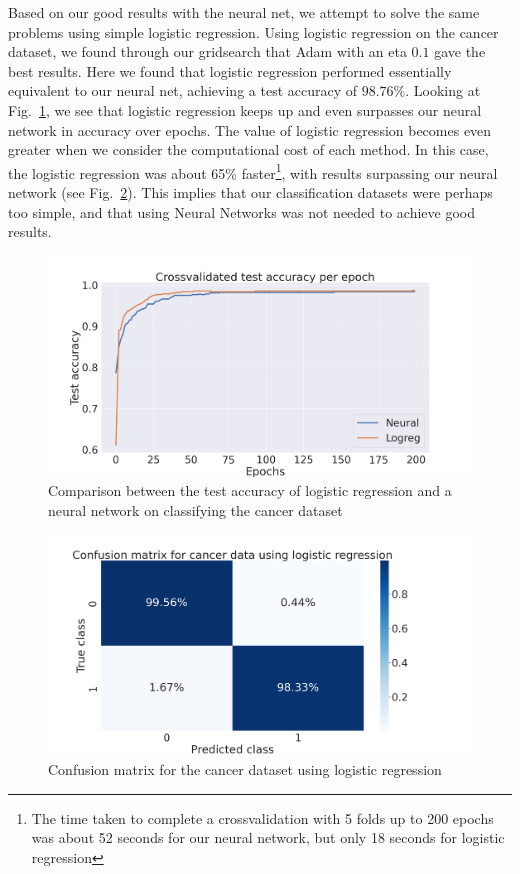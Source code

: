\documentclass[onecolumn,10pt,cleanfoot]{asme2ej}
\begin{document}
Based on our good results with the neural net, we attempt to solve the same problems using simple logistic regression. Using logistic regression on the cancer dataset, we found through our gridsearch that Adam with an eta $0.1$ gave the best results. Here we found that logistic regression performed essentially equivalent to our neural net, achieving a test accuracy of $98.76\%$. Looking at Fig.~\ref{cancerlogneur}, we see that logistic regression keeps up and even surpasses our neural network in accuracy over epochs. The value of logistic regression becomes even greater when we consider the computational cost of each method. In this case, the logistic regression was about 65\% faster\footnote{The time taken to complete a crossvalidation with 5 folds up to 200 epochs was about 52 seconds for our neural network, but only 18 seconds for logistic regression}, with results surpassing our neural network (see Fig.~\ref{cancerconflog}). This implies that our classification datasets were perhaps too simple, and that using Neural Networks was not needed to achieve good results.

\begin{figure}[h]
\centerline{\includegraphics[width=5in]{figure/comp_NN_logreg_cancer.png}}
\caption{Comparison between the test accuracy of logistic regression and a neural network on classifying the cancer dataset}
\label{cancerlogneur}
\end{figure}

\begin{figure}[h]
\centerline{\includegraphics[width=5in]{figure/conf_mat_logreg_cancer.png}}
\caption{Confusion matrix for the cancer dataset using logistic regression}
\label{cancerconflog}
\end{figure}
\end{document}
